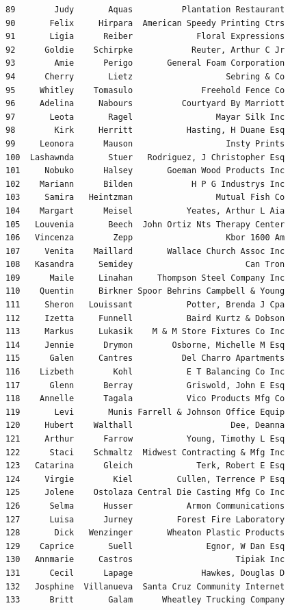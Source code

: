 \documentclass[
  12pt,
]{article}
\begin{document}
\begin{verbatim}
89        Judy       Aquas          Plantation Restaurant
90       Felix     Hirpara  American Speedy Printing Ctrs
91       Ligia      Reiber             Floral Expressions
92      Goldie    Schirpke            Reuter, Arthur C Jr
93        Amie      Perigo       General Foam Corporation
94      Cherry       Lietz                   Sebring & Co
95     Whitley    Tomasulo              Freehold Fence Co
96     Adelina     Nabours          Courtyard By Marriott
97       Leota       Ragel                 Mayar Silk Inc
98        Kirk     Herritt           Hasting, H Duane Esq
99     Leonora      Mauson                   Insty Prints
100  Lashawnda       Stuer   Rodriguez, J Christopher Esq
101     Nobuko      Halsey       Goeman Wood Products Inc
102    Mariann      Bilden            H P G Industrys Inc
103     Samira   Heintzman                 Mutual Fish Co
104    Margart      Meisel           Yeates, Arthur L Aia
105   Louvenia       Beech  John Ortiz Nts Therapy Center
106   Vincenza        Zepp                   Kbor 1600 Am
107     Venita    Maillard       Wallace Church Assoc Inc
108   Kasandra     Semidey                       Can Tron
109      Maile     Linahan     Thompson Steel Company Inc
110    Quentin     Birkner Spoor Behrins Campbell & Young
111     Sheron   Louissant           Potter, Brenda J Cpa
112     Izetta     Funnell           Baird Kurtz & Dobson
113     Markus     Lukasik    M & M Store Fixtures Co Inc
114     Jennie      Drymon        Osborne, Michelle M Esq
115      Galen     Cantres          Del Charro Apartments
116    Lizbeth        Kohl           E T Balancing Co Inc
117      Glenn      Berray           Griswold, John E Esq
118    Annelle      Tagala           Vico Products Mfg Co
119       Levi       Munis Farrell & Johnson Office Equip
120     Hubert    Walthall                    Dee, Deanna
121     Arthur      Farrow           Young, Timothy L Esq
122      Staci    Schmaltz  Midwest Contracting & Mfg Inc
123   Catarina      Gleich             Terk, Robert E Esq
124     Virgie        Kiel         Cullen, Terrence P Esq
125     Jolene    Ostolaza Central Die Casting Mfg Co Inc
126      Selma      Husser           Armon Communications
127      Luisa      Jurney         Forest Fire Laboratory
128       Dick   Wenzinger       Wheaton Plastic Products
129    Caprice       Suell               Egnor, W Dan Esq
130   Annmarie     Castros                     Tipiak Inc
131      Cecil      Lapage              Hawkes, Douglas D
132   Josphine  Villanueva  Santa Cruz Community Internet
133      Britt       Galam      Wheatley Trucking Company

\end{verbatim}
\end{document}
